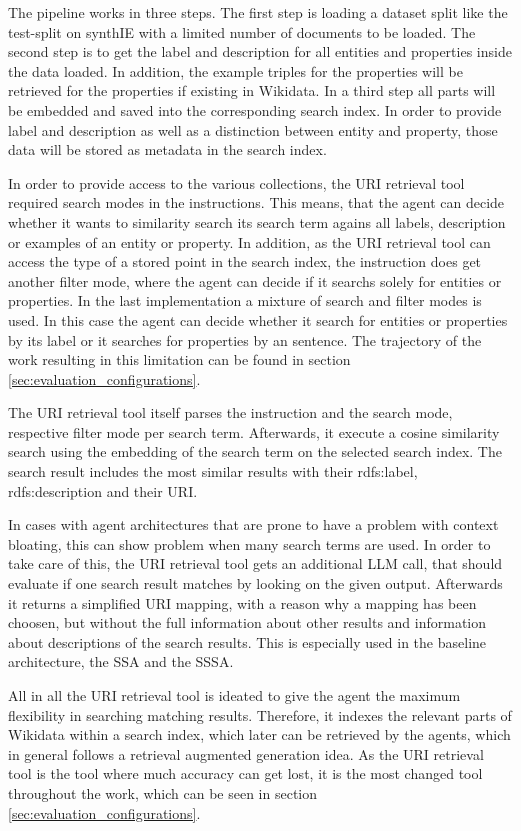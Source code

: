 \documentclass[a4paper,oneside,bibliography=totoc]{scrbook}
\begin{document}
The pipeline works in three steps. The first step is loading a dataset split like the test-split on synthIE with a limited number of documents to be loaded. The second step is to get the label and description for all entities and properties inside the data loaded. In addition, the example triples for the properties will be retrieved for the properties if existing in Wikidata. In a third step all parts will be embedded and saved into the corresponding search index. In order to provide label and description as well as a distinction between entity and property, those data will be stored as metadata in the search index.

In order to provide access to the various collections, the URI retrieval tool required search modes in the instructions. This means, that the agent can decide whether it wants to similarity search its search term agains all labels, description or examples of an entity or property. In addition, as the URI retrieval tool can access the type of a stored point in the search index, the instruction does get another filter mode, where the agent can decide if it searchs solely for entities or properties. In the last implementation a mixture of search and filter modes is used. In this case the agent can decide whether it search for entities or properties by its label or it searches for properties by an sentence. The trajectory of the work resulting in this limitation can be found in section \ref{sec:evaluation_configurations}.

The URI retrieval tool itself parses the instruction and the search mode, respective filter mode per search term. Afterwards, it execute a cosine similarity search using the embedding of the search term on the selected search index. The search result includes the most similar results with their rdfs:label, rdfs:description and their URI.

In cases with agent architectures that are prone to have a problem with context bloating, this can show problem when many search terms are used. In order to take care of this, the URI retrieval tool gets an additional \ac{LLM} call, that should evaluate if one search result matches by looking on the given output. Afterwards it returns a simplified URI mapping, with a reason why a mapping has been choosen, but without the full information about other results and information about descriptions of the search results. This is especially used in the baseline architecture, the \ac{SSA} and the \ac{SSSA}.

All in all the URI retrieval tool is ideated to give the agent the maximum flexibility in searching matching results. Therefore, it indexes the relevant parts of Wikidata within a search index, which later can be retrieved by the agents, which in general follows a retrieval augmented generation idea. As the URI retrieval tool is the tool where much accuracy can get lost, it is the most changed tool throughout the work, which can be seen in section \ref{sec:evaluation_configurations}.
\end{document}
